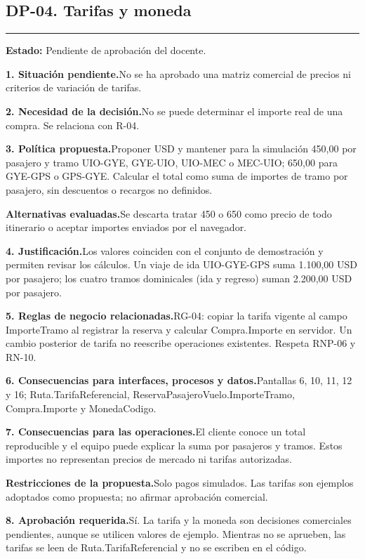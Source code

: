 \documentclass[11pt,a4paper]{article}
\newcommand{\fichacampo}[2]{\noindent\textbf{\color{azulvip}#1}\enspace #2\par\vspace{3pt}}
\begin{document}
\subsection{DP-04. Tarifas y moneda}
{\color{doradovip}\rule{\textwidth}{.5pt}}
\textbf{Estado:} Pendiente de aprobación del docente.\par\vspace{4pt}
{\normalsize
\fichacampo{1. Situación pendiente.}{No se ha aprobado una matriz comercial de precios ni criterios de variación de tarifas.}
\fichacampo{2. Necesidad de la decisión.}{No se puede determinar el importe real de una compra. Se relaciona con R-04.}
\fichacampo{3. Política propuesta.}{Proponer USD y mantener para la simulación 450,00 por pasajero y tramo UIO-GYE, GYE-UIO, UIO-MEC o MEC-UIO; 650,00 para GYE-GPS o GPS-GYE. Calcular el total como suma de importes de tramo por pasajero, sin descuentos o recargos no definidos.}
\fichacampo{Alternativas evaluadas.}{Se descarta tratar 450 o 650 como precio de todo itinerario o aceptar importes enviados por el navegador.}
\fichacampo{4. Justificación.}{Los valores coinciden con el conjunto de demostración y permiten revisar los cálculos. Un viaje de ida UIO-GYE-GPS suma 1.100,00 USD por pasajero; los cuatro tramos dominicales (ida y regreso) suman 2.200,00 USD por pasajero.}
\fichacampo{5. Reglas de negocio relacionadas.}{RG-04: copiar la tarifa vigente al campo ImporteTramo al registrar la reserva y calcular Compra.Importe en servidor. Un cambio posterior de tarifa no reescribe operaciones existentes. Respeta RNP-06 y RN-10.}
\fichacampo{6. Consecuencias para interfaces, procesos y datos.}{Pantallas 6, 10, 11, 12 y 16; Ruta.TarifaReferencial, ReservaPasajeroVuelo.ImporteTramo, Compra.Importe y MonedaCodigo.}
\fichacampo{7. Consecuencias para las operaciones.}{El cliente conoce un total reproducible y el equipo puede explicar la suma por pasajeros y tramos. Estos importes no representan precios de mercado ni tarifas autorizadas.}
\fichacampo{Restricciones de la propuesta.}{Solo pagos simulados. Las tarifas son ejemplos adoptados como propuesta; no afirmar aprobación comercial.}
\fichacampo{8. Aprobación requerida.}{Sí. La tarifa y la moneda son decisiones comerciales pendientes, aunque se utilicen valores de ejemplo. Mientras no se aprueben, las tarifas se leen de Ruta.TarifaReferencial y no se escriben en el código.}
}
\clearpage
\end{document}
